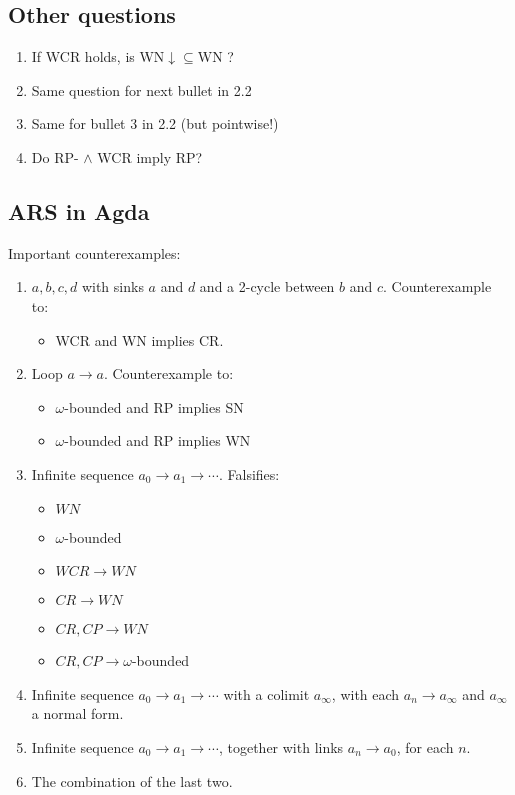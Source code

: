 \documentclass{article}
\begin{document}
\subsection{Other questions}
\begin{enumerate}
  \item If WCR holds, is WN$\downarrow\subseteq$WN ?
  \item Same question for next bullet in 2.2
  \item Same for bullet 3 in 2.2 (but pointwise!)
  \item Do RP- $\land$ WCR imply RP?
\end{enumerate}
\subsection{ARS in Agda}
Important counterexamples:
\begin{enumerate}
  \item $a,b,c,d$ with sinks $a$ and $d$ and a 2-cycle between $b$ and $c$.
  Counterexample to:
  \begin{itemize}
      \item WCR and WN implies CR.
  \end{itemize}
  \item Loop $a \to a$.
  Counterexample to:
  \begin{itemize}
    \item $\omega$-bounded and RP implies SN
    \item $\omega$-bounded and RP implies WN
  \end{itemize}
  \item Infinite sequence $a_0 \to a_1 \to \cdots$. Falsifies:
  \begin{itemize}
    \item $WN$
    \item $\omega$-bounded
    \item $WCR \to WN$
    \item $CR \to WN$
    \item $CR, CP \to WN$
    \item $CR, CP \to \omega$-bounded
  \end{itemize}
  \item Infinite sequence $a_0 \to a_1 \to \cdots$ with a colimit $a_\infty$,
  with each $a_n \to a_\infty$ and $a_\infty$ a normal form.
  \item Infinite sequence $a_0 \to a_1 \to \cdots$, together with links
  $a_n \to a_0$, for each $n$.
  \item The combination of the last two.

\end{enumerate}
\end{document}
